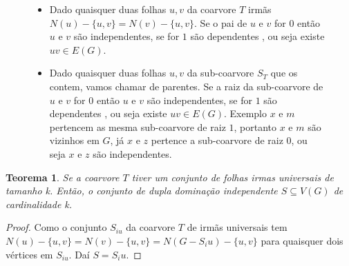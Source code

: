 \documentclass[a4paper,8pt]{article}
\theoremstyle{plain}
\newtheorem{theorem}{Teorema}[section]
\begin{document}
\begin{figure}[!htb]
         
      \begin{itemize}
          \item Dado quaisquer duas folhas $u,v$  da coarvore $T$ irmãs $N(u)-\{u,v\}=N(v)-\{u,v\}$. Se o pai de $u$ e $v$ for $0$ então $u$ e $v$ são independentes, se for $1$ são dependentes , ou seja existe $uv \in E(G)$.
          
          \item Dado quaisquer duas folhas $u,v$  da   sub-coarvore $S_T$ que os contem, vamos chamar de parentes. Se a raiz da sub-coarvore  de $u$ e $v$ for $0$ então $u$ e $v$ são independentes, se for $1$ são dependentes , ou seja existe $uv \in E(G)$. Exemplo $x$ e $m$ pertencem as mesma sub-coarvore de raiz $1$, portanto $x$ e $m$ são vizinhos em $G$, já $x$ e $z$ pertence a sub-coarvore de raiz $0$, ou seja $x$ e $z$ são independentes.
      \end{itemize}  
      
      
   \end{figure}
   
  \begin{theorem}
   Se a coarvore $T$ tiver um conjunto de folhas irmas universais de tamanho k. Então, o conjunto de dupla dominação independente $S\subseteq V(G)$ de cardinalidade k. 
  \end{theorem}       
   \begin{proof}
   Como o conjunto  $S_{iu}$  da coarvore $T$ de irmãs universais tem $N(u)-\{u,v\}= N(v)-\{u,v\}= N(G-S_iu)-\{u,v\}$ para quaisquer dois vértices em $S_{iu}$. Daí $S=S_iu$.
   \end{proof}      
\end{document}
